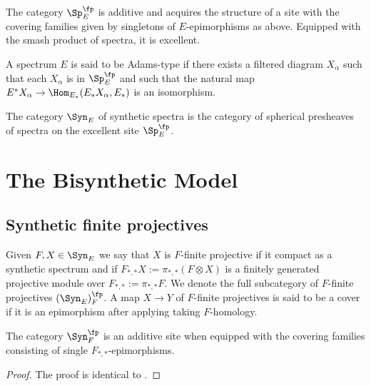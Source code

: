 \begin{lemma}
  The category $\Sp^\fp_E$ is additive and acquires the structure of a site with the covering families given by singletons of $E$-epimorphisms as above. Equipped with the smash product of spectra, it is excellent.
\end{lemma}


\begin{definition}
  A spectrum $E$ is said to be Adams-type if there exists a filtered diagram $X_\alpha$ such that each $X_\alpha$ is in $\Sp^\fp_E$ and such that the natural map $E^*X_\alpha\to \Hom_{E_*}(E_*X_\alpha, E_*)$ is an isomorphism.
\end{definition}



\begin{definition}
  The category $\Syn_E$ of synthetic spectra is the category of spherical presheaves of spectra on the excellent site $\Sp^\fp_E$.
\end{definition}



\section{The Bisynthetic Model}

\subsection{Synthetic finite projectives}

\begin{definition}
  Given $F,X\in \Syn_E$ we say that $X$ is $F$-finite projective if it compact as a synthetic spectrum and if $F_{*,*}X:=\pi_{*,*}(F\otimes X)$ is a finitely generated projective module over $F_{*,*}:=\pi_{*,*}F$. We denote the full subcategory of $F$-finite projectives $(\Syn_E)_F^\fp$. A map $X\to Y$ of $F$-finite projectives is said to be a cover if it is an epimorphism after applying taking $F$-homology.
\end{definition}

\begin{lemma}
  The category $\Syn_F^\fp$ is an additive site when equipped with the covering families consisting of single $F_{*,*}$-epimorphisms.
\end{lemma}

\begin{proof}
  The proof is identical to \cite[Lemma 3.22]{piotr}.
\end{proof}

